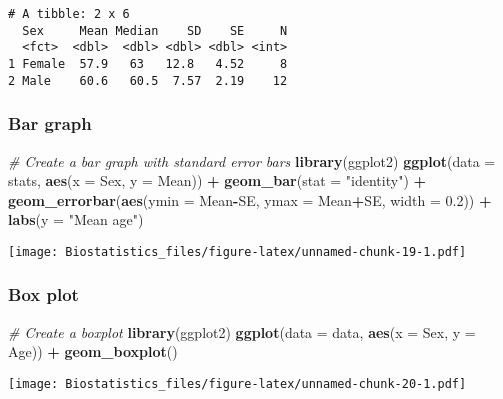\documentclass[]{book}
\newenvironment{Shaded}{\begin{snugshade}}{\end{snugshade}}
\newcommand{\KeywordTok}[1]{\textcolor[rgb]{0.13,0.29,0.53}{\textbf{#1}}}
\newcommand{\DataTypeTok}[1]{\textcolor[rgb]{0.13,0.29,0.53}{#1}}
\newcommand{\FloatTok}[1]{\textcolor[rgb]{0.00,0.00,0.81}{#1}}
\newcommand{\StringTok}[1]{\textcolor[rgb]{0.31,0.60,0.02}{#1}}
\newcommand{\CommentTok}[1]{\textcolor[rgb]{0.56,0.35,0.01}{\textit{#1}}}
\newcommand{\OperatorTok}[1]{\textcolor[rgb]{0.81,0.36,0.00}{\textbf{#1}}}
\newcommand{\NormalTok}[1]{#1}
\theoremstyle{definition}
\theoremstyle{definition}
\theoremstyle{definition}
\theoremstyle{remark}
\begin{document}
\begin{verbatim}
# A tibble: 2 x 6
  Sex     Mean Median    SD    SE     N
  <fct>  <dbl>  <dbl> <dbl> <dbl> <int>
1 Female  57.9   63   12.8   4.52     8
2 Male    60.6   60.5  7.57  2.19    12
\end{verbatim}

\subsubsection{Bar graph}\label{bar-graph}

\begin{Shaded}
\begin{Highlighting}[]
\CommentTok{# Create a bar graph with standard error bars}
\KeywordTok{library}\NormalTok{(ggplot2)}
\KeywordTok{ggplot}\NormalTok{(}\DataTypeTok{data =}\NormalTok{ stats, }\KeywordTok{aes}\NormalTok{(}\DataTypeTok{x =}\NormalTok{ Sex, }\DataTypeTok{y =}\NormalTok{ Mean)) }\OperatorTok{+}
\StringTok{  }\KeywordTok{geom_bar}\NormalTok{(}\DataTypeTok{stat =} \StringTok{"identity"}\NormalTok{) }\OperatorTok{+}
\StringTok{  }\KeywordTok{geom_errorbar}\NormalTok{(}\KeywordTok{aes}\NormalTok{(}\DataTypeTok{ymin =}\NormalTok{ Mean}\OperatorTok{-}\NormalTok{SE, }\DataTypeTok{ymax =}\NormalTok{ Mean}\OperatorTok{+}\NormalTok{SE, }\DataTypeTok{width =} \FloatTok{0.2}\NormalTok{)) }\OperatorTok{+}
\StringTok{  }\KeywordTok{labs}\NormalTok{(}\DataTypeTok{y =} \StringTok{"Mean age"}\NormalTok{)}
\end{Highlighting}
\end{Shaded}

\texttt{[image: Biostatistics\_files/figure-latex/unnamed-chunk-19-1.pdf]}

\subsubsection{Box plot}\label{box-plot}

\begin{Shaded}
\begin{Highlighting}[]
\CommentTok{# Create a boxplot}
\KeywordTok{library}\NormalTok{(ggplot2)}
\KeywordTok{ggplot}\NormalTok{(}\DataTypeTok{data =}\NormalTok{ data, }\KeywordTok{aes}\NormalTok{(}\DataTypeTok{x =}\NormalTok{ Sex, }\DataTypeTok{y =}\NormalTok{ Age)) }\OperatorTok{+}
\StringTok{  }\KeywordTok{geom_boxplot}\NormalTok{()}
\end{Highlighting}
\end{Shaded}

\texttt{[image: Biostatistics\_files/figure-latex/unnamed-chunk-20-1.pdf]}
\end{document}
